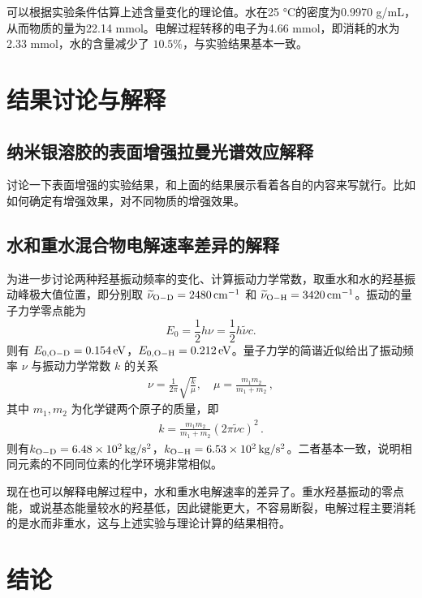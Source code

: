 \documentclass[UTF8]{article}
\def\dC{\si{\degreeCelsius}}
\newcommand{\dw}[1]{\,\mathrm{#1}}
\begin{document}
	可以根据实验条件估算上述含量变化的理论值。水在25 \dC 的密度为0.9970 g/mL，从而物质的量为22.14 mmol。电解过程转移的电子为4.66 mmol，即消耗的水为2.33 mmol，水的含量减少了 $10.5\%$，与实验结果基本一致。

	\section{结果讨论与解释}

	\subsection{纳米银溶胶的表面增强拉曼光谱效应解释}
	讨论一下表面增强的实验结果，和上面的结果展示看着各自的内容来写就行。比如如何确定有增强效果，对不同物质的增强效果。

	\subsection{水和重水混合物电解速率差异的解释}
	为进一步讨论两种羟基振动频率的变化、计算振动力学常数，取重水和水的羟基振动峰极大值位置，即分别取 $\widetilde{\nu} _{\ce{O-D}} = 2480 \dw{cm^{-1}} $ 和 $ \widetilde{\nu} _{\ce{O-H}} = 3420 \dw{cm^{-1}} $。振动的量子力学零点能为
	\begin{equation*}
		E_0 = \frac{1}{2} h \nu = \frac{1}{2} h \widetilde{\nu} c  .
	\end{equation*}
	则有 $E_{0, \ce{O-D}} = 0.154 \dw{eV}$，$E_{0, \ce{O-H}} = 0.212 \dw{eV}$。量子力学的简谐近似给出了振动频率 $\nu$ 与振动力学常数 $k$ 的关系
	\begin{gather*}
		\nu = \frac{1}{2\pi} \sqrt{\frac{k}{\mu}} ,\quad \mu = \frac{m_1 m_2}{m_1 + m_2}\,,
	\end{gather*}
	其中 $m_1, m_2$ 为化学键两个原子的质量，即
	\begin{gather*}
		k = \frac{m_1 m_2}{m_1 + m_2} (2\pi \widetilde{\nu} c)^2 \,.
	\end{gather*}
	则有$k_{\ce{O-D}} = 6.48\times 10^2 \dw{kg/s^2}$，$k_{\ce{O-H}} = 6.53\times 10^2 \dw{kg/s^2}$。二者基本一致，说明相同元素的不同同位素的化学环境非常相似。

	现在也可以解释电解过程中，水和重水电解速率的差异了。重水羟基振动的零点能，或说基态能量较水的羟基低，因此键能更大，不容易断裂，电解过程主要消耗的是水而非重水，这与上述实验与理论计算的结果相符。

	\section{结论}
\end{document}
